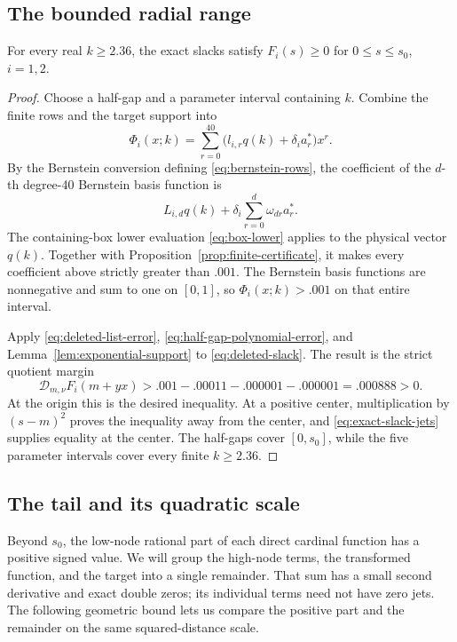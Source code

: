 \subsection{The bounded radial range}

\begin{lemma}\label{lem:half-gap-signs}
For every real \(k\ge2.36\), the exact slacks satisfy \(F_i(s)\ge0\) for
\(0\le s\le s_0\), \(i=1,2\).
\end{lemma}

\begin{proof}
Choose a half-gap and a parameter interval containing \(k\).  Combine the
finite rows and the target support into
\[
 \Phi_i(x;k)=\sum_{r=0}^{40}
       \bigl(l_{i,r}q(k)+\delta_i a_r^*\bigr)x^r.
\]
By the Bernstein conversion defining \eqref{eq:bernstein-rows}, the
coefficient of the \(d\)-th degree-40 Bernstein basis function is
\[
 L_{i,d}q(k)+\delta_i\sum_{r=0}^d\omega_{dr}a_r^*.
\]
The containing-box lower evaluation \eqref{eq:box-lower} applies to the
physical vector \(q(k)\).  Together with
Proposition~\ref{prop:finite-certificate}, it makes every coefficient above
strictly greater than \(.001\).  The Bernstein basis functions are
nonnegative and sum to one on \([0,1]\), so \(\Phi_i(x;k)>.001\) on that
entire interval.

Apply \eqref{eq:deleted-list-error},
\eqref{eq:half-gap-polynomial-error}, and
Lemma~\ref{lem:exponential-support} to \eqref{eq:deleted-slack}.  The result is
the strict quotient margin
\[
 \mathcal D_{m,\nu}F_i(m+yx)
 >.001-.00011-.000001-.000001=.000888>0.
\]
At the origin this is the desired inequality.  At a positive center,
multiplication by \((s-m)^2\) proves the inequality away from the center, and
\eqref{eq:exact-slack-jets} supplies equality at the center.  The half-gaps
cover \([0,s_0]\), while the five parameter intervals cover every finite
\(k\ge2.36\).
\end{proof}

\subsection{The tail and its quadratic scale}

Beyond \(s_0\), the low-node rational part of each direct cardinal function
has a positive signed value.  We will group the high-node terms, the
transformed function, and the target into a single remainder.  That sum has
a small second derivative and exact double zeros; its individual terms need
not have zero jets.  The following geometric bound lets us compare the
positive part and the remainder on the same squared-distance scale.

